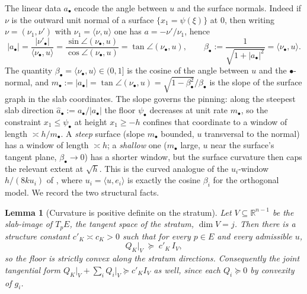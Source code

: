 \documentclass[11pt]{article}
\newtheorem{lemma}[theorem]{Lemma}
\newcommand{\R}{\mathbb{R}}
\begin{document}
The linear data $a_\bullet$ encode the angle between $u$ and the surface
normals.  Indeed if $\nu$ is the outward unit normal of a surface
$\{x_1=\psi(\xi)\}$ at $0$, then writing $\nu=(\nu_1,\nu')$ with
$\nu_1=\langle\nu,u\rangle$ one has $a=-\nu'/\nu_1$, hence
\begin{equation}\label{eq:beta}
|a_\bullet|=\frac{|\nu'_\bullet|}{\langle\nu_\bullet,u\rangle}
=\frac{\sin\angle(\nu_\bullet,u)}{\cos\angle(\nu_\bullet,u)}=\tan\angle(\nu_\bullet,u),
\qquad
\beta_\bullet:=\frac1{\sqrt{1+|a_\bullet|^2}}=\langle\nu_\bullet,u\rangle .
\end{equation}
The quantity $\beta_\bullet=\langle\nu_\bullet,u\rangle\in(0,1]$ is the cosine of
the angle between $u$ and the $\bullet$-normal, and
$m_\bullet:=|a_\bullet|=\tan\angle(\nu_\bullet,u)=\sqrt{1-\beta_\bullet^2}/\beta_\bullet$
is the slope of the surface graph in the slab coordinates.  The slope governs
the pinning: along the steepest slab direction
$\hat a_\bullet:=a_\bullet/|a_\bullet|$ the floor $\psi_\bullet$ decreases at
unit rate $m_\bullet$, so the constraint $x_1\le\psi_\bullet$ at height
$x_1\ge-h$ confines that coordinate to a window of length
$\asymp h/m_\bullet$.  A \emph{steep} surface (slope $m_\bullet$ bounded, $u$
transversal to the normal) has a window of length $\asymp h$; a \emph{shallow}
one ($m_\bullet$ large, $u$ near the surface's tangent plane,
$\beta_\bullet\to0$) has a shorter window, but the surface curvature then caps
the relevant extent at $\sqrt h$.  This is the curved analogue of the
$u_i$-window $h/(8ku_i)$ of \cite{companion11}, where $u_i=\langle u,e_i\rangle$
is exactly the cosine $\beta_i$ for the orthogonal model.  We record the two
structural facts.

\begin{lemma}[Curvature is positive definite on the stratum]\label{lem:pd}
Let $V\subseteq\R^{n-1}$ be the slab-image of $T_pE$, the tangent space of the
stratum, $\dim V=j$.  Then there is a structure constant $c'_K\asymp c_K>0$ such
that for every $p\in E$ and every admissible $u$,
\[
Q_K\big|_V\;\succeq\;c'_K\,I_V,
\]
so the floor is strictly convex along the stratum directions.  Consequently the
joint tangential form $Q_K\big|_V+\sum_i Q_i\big|_V\succeq c'_K I_V$ as well,
since each $Q_i\succeq0$ by convexity of $g_i$.
\end{lemma}
\end{document}
